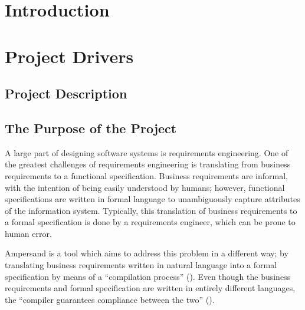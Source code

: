 \documentclass[12pt]{report}
\begin{document}
\newpage

\tableofcontents
\listoffigures
\listoftables

\newpage
{} %

{\chapter{Introduction}\label{ch:Intro}}
{\chapter{Project Drivers}\label{ch:Drivers}}

{\section{Project Description}\label{sec:Intro}}
{\section{The Purpose of the Project}\label{sec:Purpose}}
A large part of designing software systems is requirements engineering. One
of the greatest challenges of requirements engineering is translating from
business requirements to a functional specification. Business requirements are
informal, with the intention of being easily understood by humans; however,
functional specifications are written in formal language to unambiguously capture attributes of the 
information system. Typically, this translation
of business requirements to a formal specification is done by a requirements
engineer, which can be prone to human error.

Ampersand is a tool which aims to address this problem in a different way; by
translating business requirements written in natural language into a formal
specification by means of a ``compilation process'' (\cite{derFun}). 
%
%
Even though the business requirements and formal specification are written in
entirely different languages, the ``compiler guarantees compliance between the
two'' (\cite[2]{derFun}). 
\end{document}
